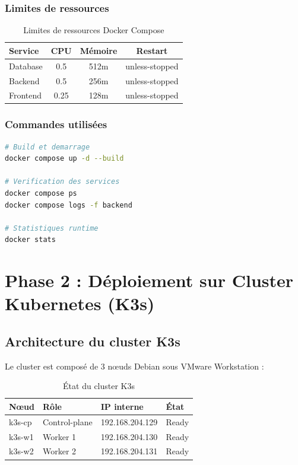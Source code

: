 \documentclass[12pt,a4paper]{report}
\begin{document}
\subsection{Limites de ressources}

\begin{table}[h]
\centering
\begin{tabular}{|l|c|c|c|}
\hline
\textbf{Service} & \textbf{CPU} & \textbf{Mémoire} & \textbf{Restart} \\
\hline
Database & 0.5 & 512m & unless-stopped \\
Backend & 0.5 & 256m & unless-stopped \\
Frontend & 0.25 & 128m & unless-stopped \\
\hline
\end{tabular}
\caption{Limites de ressources Docker Compose}
\end{table}

\subsection{Commandes utilisées}

\begin{lstlisting}[language=bash]
# Build et demarrage
docker compose up -d --build

# Verification des services
docker compose ps
docker compose logs -f backend

# Statistiques runtime
docker stats
\end{lstlisting}

\chapter{Phase 2 : Déploiement sur Cluster Kubernetes (K3s)}

\section{Architecture du cluster K3s}

Le cluster est composé de 3 nœuds Debian sous VMware Workstation :

\begin{table}[h]
\centering
\begin{tabular}{|l|l|l|l|}
\hline
\textbf{Nœud} & \textbf{Rôle} & \textbf{IP interne} & \textbf{État} \\
\hline
k3s-cp & Control-plane & 192.168.204.129 & Ready \\
k3s-w1 & Worker 1 & 192.168.204.130 & Ready \\
k3s-w2 & Worker 2 & 192.168.204.131 & Ready \\
\hline
\end{tabular}
\caption{État du cluster K3s}
\end{table}
\end{document}

